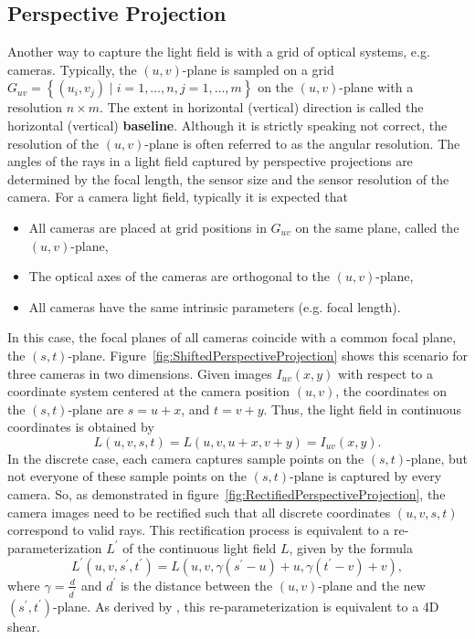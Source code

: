 \subsection*{Perspective Projection}
\begin{sloppypar}
	Another way to capture the light field is with a grid of optical systems, e.g. cameras.
	Typically, the $(u, v)$-plane is sampled on a grid $G_{uv} = \left \{ \left( u_i, v_j \right) \mid i = 1,\dots, n, j = 1, \dots, m\right \}$ on the $(u, v)$-plane with a resolution $n \times m$.
	The extent in horizontal (vertical) direction is called the horizontal (vertical) \textbf{baseline}.
	Although it is strictly speaking not correct, the resolution of the $(u, v)$-plane is often referred to as the angular resolution. 
	The angles of the rays in a light field captured by perspective projections are determined by the focal length, the sensor size and the sensor resolution of the camera.
	For a camera light field, typically it is expected that
	\begin{itemize}
		\item All cameras are placed at grid positions in $G_{uv}$ on the same plane, called the $(u, v)$-plane, 
		\item The optical axes of the cameras are orthogonal to the $(u, v)$-plane, 
		\item All cameras have the same intrinsic parameters (e.g. focal length).
	\end{itemize}
\end{sloppypar}
\noindent
In this case, the focal planes of all cameras coincide with a common focal plane, the $(s, t)$-plane.
Figure~\ref{fig:ShiftedPerspectiveProjection} shows this scenario for three cameras in two dimensions.
Given images $I_{uv}(x, y)$ with respect to a coordinate system centered at the camera position $(u, v)$, the coordinates on the $(s, t)$-plane are $s = u + x$, and $t = v + y$.
Thus, the light field in continuous coordinates is obtained by 
\begin{equation}
	L(u, v, s, t) = L(u, v, u + x, v + y) = I_{uv}(x, y).
\end{equation}
In the discrete case, each camera captures sample points on the $(s, t)$-plane, but not everyone of these sample points on the $(s, t)$-plane is captured by every camera.
So, as demonstrated in figure~\ref*{fig:RectifiedPerspectiveProjection}, the camera images need to be rectified such that all discrete coordinates $(u, v, s, t)$ correspond to valid rays.
This rectification process is equivalent to a re-parameterization $L^\prime$ of the continuous light field $L$, given by the formula
\begin{equation}\label{eq:two_plane_reparameterization}
	L^\prime (u, v, s^\prime, t^\prime) = L \left(u, v, \gamma (s^\prime - u) + u, \gamma (t^\prime - v) + v \right), 
\end{equation}
where $\gamma = \frac{d}{d^\prime}$ and $d^\prime$ is the distance between the $(u, v)$-plane and the new \mbox{$(s^\prime, t^\prime)$-plane}.
As derived by \cite{DynamicallyReparameterizedLF}, this re-parameterization is equivalent to a 4D shear.

